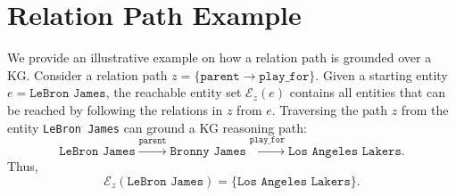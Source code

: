\documentclass{article}
\begin{document}












\appendix

\section{Relation Path Example}\label{app:path_example}

We provide an illustrative example on how a relation path is grounded over a KG.
Consider a relation path
$z = \{\texttt{parent} \rightarrow \texttt{play\_for} \}$.
Given a starting entity $e=\texttt{LeBron James}$, the reachable entity set
$\mathcal{E}_z(e)$ contains all entities that can be reached by following the relations in $z$ from $e$.
Traversing the path $z$ from the entity \texttt{LeBron James} can ground a KG reasoning path:
\[
\texttt{LeBron James}
\xrightarrow{\texttt{parent}}
\texttt{Bronny James}
\xrightarrow{\texttt{play\_for}}
\texttt{Los Angeles Lakers}.
\]
Thus,
\[
\mathcal{E}_z(\texttt{LeBron James})
=
\{\texttt{Los Angeles Lakers}\}.
\]
\end{document}
